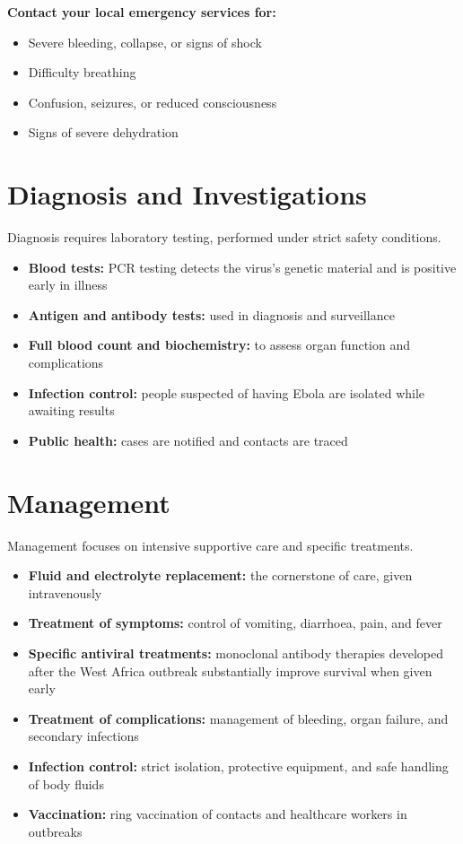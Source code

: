 \textbf{Contact your local emergency services for:}
\begin{itemize}
    \item Severe bleeding, collapse, or signs of shock
    \item Difficulty breathing
    \item Confusion, seizures, or reduced consciousness
    \item Signs of severe dehydration
\end{itemize}

\section*{Diagnosis and Investigations}
Diagnosis requires laboratory testing, performed under strict safety conditions.
\begin{itemize}
    \item \textbf{Blood tests:} PCR testing detects the virus's genetic material and is positive early in illness
    \item \textbf{Antigen and antibody tests:} used in diagnosis and surveillance
    \item \textbf{Full blood count and biochemistry:} to assess organ function and complications
    \item \textbf{Infection control:} people suspected of having Ebola are isolated while awaiting results
    \item \textbf{Public health:} cases are notified and contacts are traced
\end{itemize}

\section*{Management}
Management focuses on intensive supportive care and specific treatments.
\begin{itemize}
    \item \textbf{Fluid and electrolyte replacement:} the cornerstone of care, given intravenously
    \item \textbf{Treatment of symptoms:} control of vomiting, diarrhoea, pain, and fever
    \item \textbf{Specific antiviral treatments:} monoclonal antibody therapies developed after the West Africa outbreak substantially improve survival when given early
    \item \textbf{Treatment of complications:} management of bleeding, organ failure, and secondary infections
    \item \textbf{Infection control:} strict isolation, protective equipment, and safe handling of body fluids
    \item \textbf{Vaccination:} ring vaccination of contacts and healthcare workers in outbreaks
\end{itemize}


